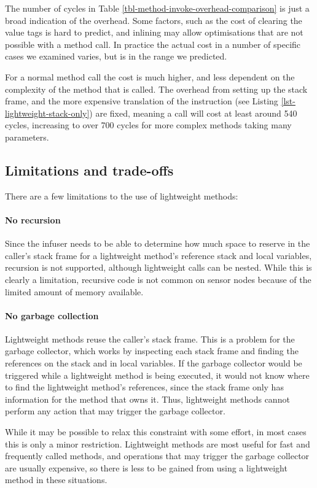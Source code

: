The number of cycles in Table \ref{tbl-method-invoke-overhead-comparison} is just a broad indication of the overhead. Some factors, such as the cost of clearing the value tags is hard to predict, and inlining may allow optimisations that are not possible with a method call. In practice the actual cost in a number of specific cases we examined varies, but is in the range we predicted.

For a normal method call the cost is much higher, and less dependent on the complexity of the method that is called. The overhead from setting up the stack frame, and the more expensive translation of the  instruction (see Listing \ref{lst-lightweight-stack-only}) are fixed, meaning a call will cost at least around 540 cycles, increasing to over 700 cycles for more complex methods taking many parameters.




\subsection{Limitations and trade-offs}
There are a few limitations to the use of lightweight methods:

\paragraph{No recursion} Since the infuser needs to be able to determine how much space to reserve in the caller's stack frame for a lightweight method's reference stack and local variables, recursion is not supported, although lightweight calls can be nested. While this is clearly a limitation, recursive code is not common on sensor nodes because of the limited amount of memory available.

\paragraph{No garbage collection}
Lightweight methods reuse the caller's stack frame. This is a problem for the garbage collector, which works by inspecting each stack frame and finding the references on the stack and in local variables. If the garbage collector would be triggered while a lightweight method is being executed, it would not know where to find the lightweight method's references, since the stack frame only has information for the method that owns it. Thus, lightweight methods cannot perform any action that may trigger the garbage collector.

While it may be possible to relax this constraint with some effort, in most cases this is only a minor restriction. Lightweight methods are most useful for fast and frequently called methods, and operations that may trigger the garbage collector are usually expensive, so there is less to be gained from using a lightweight method in these situations.

